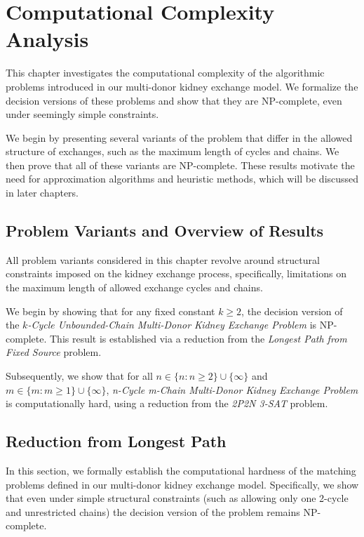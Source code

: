 \chapter{Computational Complexity Analysis}
\label{cha:computational_complexity_analysis}

This chapter investigates the computational complexity of the algorithmic problems introduced in our multi-donor kidney exchange model. We formalize the decision versions of these problems and show that they are NP-complete, even under seemingly simple constraints.

We begin by presenting several variants of the problem that differ in the allowed structure of exchanges, such as the maximum length of cycles and chains. We then prove that all of these variants are NP-complete. These results motivate the need for approximation algorithms and heuristic methods, which will be discussed in later chapters.

\section{Problem Variants and Overview of Results}

All problem variants considered in this chapter revolve around structural constraints imposed on the kidney exchange process, specifically, limitations on the maximum length of allowed exchange cycles and chains.

We begin by showing that for any fixed constant $k \ge 2$, the decision version of the \textit{$k$-Cycle Unbounded-Chain Multi-Donor Kidney Exchange Problem} is NP-complete. This result is established via a reduction from the \textit{Longest Path from Fixed Source} problem.

Subsequently, we show that for all $n \in \{n : n \ge 2\} \cup \{\infty\}$ and $m \in \{m:m \ge 1\} \cup \{\infty\}$, \textit{n-Cycle m-Chain Multi-Donor Kidney Exchange Problem} is computationally hard, using a reduction from the \textit{2P2N 3-SAT} problem.



\section{Reduction from Longest Path}

In this section, we formally establish the computational hardness of the matching problems defined in our multi-donor kidney exchange model. Specifically, we show that even under simple structural constraints (such as allowing only one 2-cycle and unrestricted chains) the decision version of the problem remains NP-complete. 

